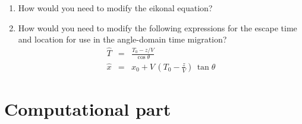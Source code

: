\begin{enumerate}
\item How would you need to modify the eikonal equation?
\item How would you need to modify the following expressions for the escape time and location for use in the angle-domain time migration?
\begin{eqnarray}
\hat{T} & = & \frac{T_0-z/V}{\cos{\theta}} \\
\hat{x} & = & x_0 + V\,\left(T_0-\frac{z}{V}\right)\,\tan{\theta}
\end{eqnarray}
\end{enumerate}

\section{Computational part}

